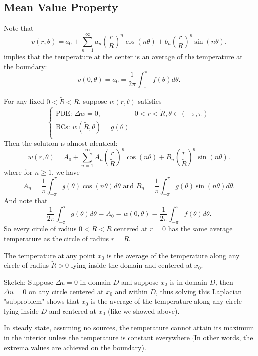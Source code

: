 \documentclass[class=article,crop=false]{standalone}
\begin{document}
\subsection{Mean Value Property}

Note that 
 \[
	 v(r,\theta)= a_0 + \sum_{ n= 1}^{\infty} a_n \left( \frac{r}{R} \right)^{n}  \cos(n \theta ) + b_n \left( \frac{r}{R} \right)^{n} \sin(n\theta ) 
.\] 
implies that the temperature at the center is an average of the temperature at the boundary: \[ v(0, \theta) = a_0 = \frac{1}{2\pi} \int_{-\pi}^{\pi} f(\theta) d\theta .\]

For any fixed $ 0< \tilde{R} < R$, suppose  $ w(r,\theta)$ satisfies
\begin{equation*}
\begin{cases}
	\text{PDE: } \Delta w=0,  & 0<r<\tilde{R}, \theta \in (-\pi,\pi) \\
	\text{BCs: } w( \tilde{R},\theta) = g(\theta) & \\
\end{cases}
\end{equation*}
Then the solution is almost identical:
\[
	w(r,\theta) = A_0 + \sum_{ n= 1}^{\infty} A_n \left( \frac{r}{\tilde{R}} \right)^{n} \cos(n\theta ) + B_n \left( \frac{r}{\tilde{R}} \right) ^{n} \sin(n\theta )
.\] 
where for $ n\geq 1$, we have
 \[
	 A_n = \frac{1}{\pi} \int_{-\pi}^{\pi} g(\theta) \cos(n\theta )  d\theta \text{  and  } B_n = \frac{1}{\pi} \int_{-\pi}^{\pi} g(\theta) \sin(n \theta ) d\theta 
.\]
And note that
\[
	\frac{1}{2\pi} \int_{-\pi}^{\pi} g(\theta) d\theta = A_0 = w(0,\theta)= \frac{1}{2\pi} \int_{-\pi}^{\pi} f(\theta) d\theta 
.\] 
So every circle of radius $ 0<\tilde{R}<R$ centered at  $ r=0$ has the same average temperature as the circle of radius  $ r=R$.

\begin{thm}
	The temperature at any point $ x_0$ is the average of the temperature along any circle of radius $ \tilde{R}>0$ lying inside the domain and centered at  $ x_0$.
\end{thm}
\begin{prf}
	Sketch: Suppose $ \Delta u=0$ in domain $ D$ and suppose  $ x_0$ is in domain $ D$, then  $ \Delta u = 0$ on any circle centered at $ x_0$ and within $ D$, thus solving this Laplacian "subproblem" shows that  $ x_0$ is the average of the temperature along any circle lying inside $ D$ and centered at  $ x_0$ (like we showed above).
\end{prf}
\begin{thm}
	In steady state, assuming no sources, the temperature cannot attain its maximum in the interior unless the temperature is constant everywhere (In other words, the extrema values are achieved on the boundary).
\end{thm}
\end{document}
